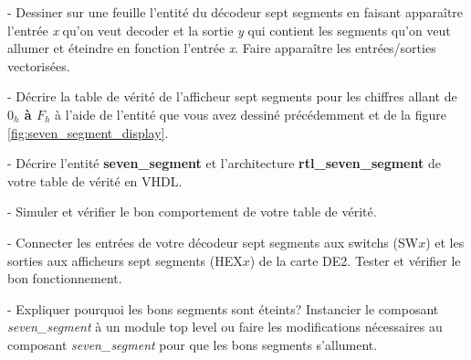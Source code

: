 \medskip

- Dessiner sur une feuille l'entité du décodeur sept segments en faisant apparaître l'entrée \textit{x} qu'on veut decoder et la sortie \textit{y} qui contient les segments qu'on veut allumer et éteindre en fonction l'entrée \textit{x}. Faire apparaître les entrées/sorties vectorisées.

\medskip

- Décrire la table de vérité de l'afficheur sept segments pour les chiffres allant de \textbf{$0_h$ à $F_h$} à l'aide de l'entité que vous avez dessiné précédemment et de la figure \ref{fig:seven_segment_display}.

\medskip

- Décrire l'entité \textbf{seven\_segment} et l'architecture \textbf{rtl\_seven\_segment} de votre table de vérité en VHDL.

\medskip

- Simuler et vérifier le bon comportement de votre table de vérité.

\medskip

- Connecter les entrées de votre décodeur sept segments aux switchs (SW$x$) et les sorties aux afficheurs sept segments (HEX$x$) de la carte DE2. Tester et vérifier le bon fonctionnement.

\medskip

- Expliquer pourquoi les bons segments sont éteints? Instancier le composant \textit{seven\_segment} à un module top level ou faire les modifications nécessaires au composant \textit{seven\_segment} pour que les bons segments s'allument.
